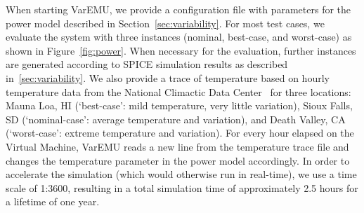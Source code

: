 When starting VarEMU, we provide a configuration file with parameters for the power model described in Section~\ref{sec:variability}. For most test cases, we evaluate the system with three instances (nominal, best-case, and worst-case) as shown in Figure~\ref{fig:power}. When necessary for the evaluation, further instances are generated according to SPICE simulation results as described in~\ref{sec:variability}. We also provide a trace of temperature based on hourly temperature data from the National Climactic Data Center~\cite{ncdc} for three locations: Mauna Loa, HI (`best-case': mild temperature, very little variation), Sioux Falls, SD (`nominal-case': average temperature and variation), and Death Valley, CA (`worst-case': extreme temperature and variation). For every hour elapsed on the Virtual Machine, VarEMU reads a new line from the temperature trace file and changes the temperature parameter in the power model accordingly. In order to accelerate the simulation (which would otherwise run in real-time), we use a time scale of 1:3600, resulting in a total simulation time of approximately 2.5 hours for a lifetime of one year.




